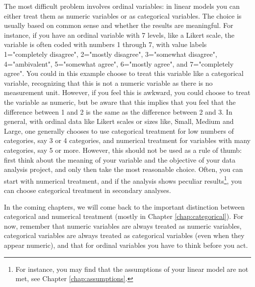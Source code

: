 The most difficult problem involves ordinal variables: in linear models you can either treat them as numeric variables or as categorical variables. The choice is usually based on common sense and whether the results are meaningful. For instance, if you have an ordinal variable with 7 levels, like a Likert scale, the variable is often coded with numbers 1 through 7, with value labels 1="completely disagree", 2="mostly disagree", 3="somewhat disagree", 4="ambivalent", 5="somewhat agree", 6="mostly agree", and 7="completely agree". You could in this example choose to treat this variable like a categorical variable, recognizing that this is not a numeric variable as there is no measurement unit. However, if you feel this is awkward, you could choose to treat the variable as numeric, but be aware that this implies that you feel that the difference between 1 and 2 is the same as the difference between 2 and 3. In general, with ordinal data like Likert scales or sizes like, Small, Medium and Large, one generally chooses to use categorical treatment for low numbers of categories, say 3 or 4 categories, and numerical treatment for variables with many categories, say 5 or more. However, this should not be used as a rule of thumb: first think about the meaning of your variable and the objective of your data analysis project, and only then take the most reasonable choice. Often, you can start with numerical treatment, and if the analysis shows peculiar results\footnote{For instance, you may find that the assumptions of your linear model are not met, see Chapter \ref{chap:assumptions}.}, you can choose categorical treatment in secondary analyses.

In the coming chapters, we will come back to the important distinction between categorical and numerical treatment (mostly in Chapter \ref{chap:categorical}). For now, remember that numeric variables are always treated as numeric variables, categorical variables are always treated as categorical variables (even when they appear numeric), and that for ordinal variables you have to think before you act.



